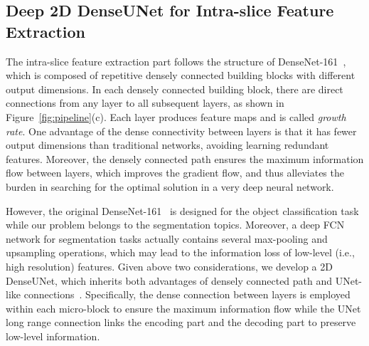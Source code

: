 \documentclass[journal]{IEEEtran}
\begin{document}
\subsection{Deep 2D DenseUNet for Intra-slice Feature Extraction}
The intra-slice feature extraction part follows the structure of DenseNet-161~\cite{huang2017densely}, which is composed of repetitive densely connected building blocks with different output dimensions.
In each densely connected building block, there are direct connections from any layer to all subsequent layers, as shown in Figure~\ref{fig:pipeline}(c).
Each layer produces  feature maps and  is called \emph{growth rate}. One advantage of the dense connectivity between layers is that it has fewer output dimensions than traditional networks, avoiding learning redundant features. Moreover, the densely connected path ensures the maximum information flow between layers, which improves the gradient flow, and thus alleviates the burden in searching for the optimal solution in a very deep neural network.

However, the original DenseNet-161~\cite{huang2017densely} is designed for the object classification task while our problem belongs to the segmentation topics. Moreover, a deep FCN network for segmentation tasks actually contains several max-pooling and upsampling operations, which may lead to the information loss of low-level (i.e., high resolution) features. Given above two considerations, we develop a 2D DenseUNet, which inherits both advantages of densely connected path and UNet-like connections~\citep{ronneberger2015u}. Specifically, the dense connection between layers is employed within each micro-block to ensure the maximum information flow while the UNet long range connection links the encoding part and the decoding part to preserve low-level information.
\end{document}
